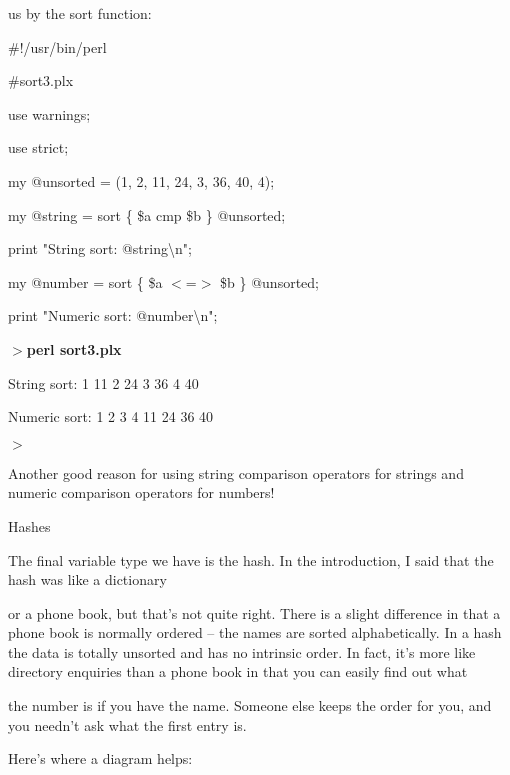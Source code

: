\documentclass[a4paper,11pt]{book}
\begin{document}
\noindent us by the sort function:

\noindent 

\noindent \#!/usr/bin/perl

\noindent \#sort3.plx

\noindent use warnings;

\noindent use strict;

\noindent my @unsorted = (1, 2, 11, 24, 3, 36, 40, 4);

\noindent 

\noindent 

\noindent my @string = sort \{ \$a cmp \$b \} @unsorted;

\noindent print "String sort:  @string\textbackslash n";

\noindent 

\noindent my @number = sort \{ \$a $<$=$>$ \$b \} @unsorted;

\noindent print "Numeric sort:  @number\textbackslash n";

\noindent 

\noindent $>$\textbf{perl sort3.plx}

\noindent String sort:  1 11 2 24 3 36 4 40

\noindent Numeric sort:  1 2 3 4 11 24 36 40

\noindent $>$

\noindent 

\noindent Another good reason for using string comparison operators for strings and numeric comparison operators for numbers!

\noindent 

\noindent 

\noindent Hashes

\noindent 

\noindent The final variable type we have is the hash. In the introduction, I said that the hash was like a dictionary

\noindent or a phone book, but that's not quite right. There is a slight difference in that a phone book is normally ordered -- the names are sorted alphabetically. In a hash the data is totally unsorted and has no intrinsic order. In fact, it's more like directory enquiries than a phone book in that you can easily find out what

\noindent the number is if you have the name. Someone else keeps the order for you, and you needn't ask what the first entry is.

\noindent 

\noindent Here's where a diagram helps:
\end{document}
